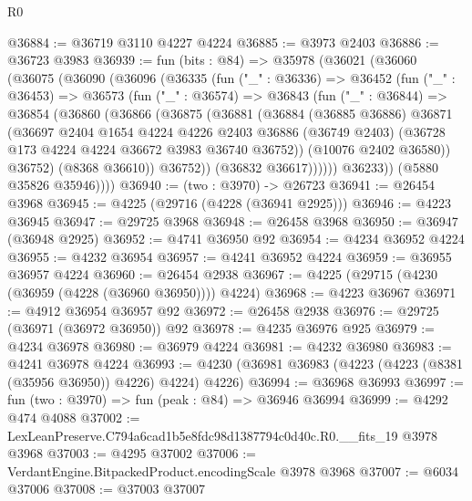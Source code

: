 \begin{lexlean}{R0}
\begin{coremodule}
@36884 := @36719 @3110 @4227 @4224
@36885 := @3973 @2403
@36886 := @36723 @3983
@36939 := fun (bits : @84) =>
  @35978
    (@36021
      (@36060
        (@36075
          (@36090
            (@36096
              (@36335
                (fun ("_" : @36336) =>
                @36452
                  (fun ("_" : @36453) =>
                  @36573
                    (fun ("_" : @36574) =>
                    @36843
                      (fun ("_" : @36844) =>
                      @36854
                        (@36860
                          (@36866
                            (@36875
                              (@36881
                                (@36884
                                  (@36885 @36886)
                                  @36871
                                  (@36697
                                    @2404
                                    @1654
                                    @4224
                                    @4226
                                    @2403
                                    @36886
                                    (@36749 @2403)
                                    (@36728 @173 @4224 @4224 @36672 @3983 @36740 @36752))
                                  (@10076 @2402 @36580))
                                @36752)
                              (@8368 @36610))
                            @36752))
                        (@36832 @36617))))))
              @36233))
          (@5880 @35826 @35946))))
@36940 := (two : @3970) -> @26723
@36941 := @26454 @3968
@36945 := @4225 (@29716 (@4228 (@36941 @2925)))
@36946 := @4223 @36945
@36947 := @29725 @3968
@36948 := @26458 @3968
@36950 := @36947 (@36948 @2925)
@36952 := @4741 @36950 @92
@36954 := @4234 @36952 @4224
@36955 := @4232 @36954
@36957 := @4241 @36952 @4224
@36959 := @36955 @36957 @4224
@36960 := @26454 @2938
@36967 := @4225 (@29715 (@4230 (@36959 (@4228 (@36960 @36950)))) @4224)
@36968 := @4223 @36967
@36971 := @4912 @36954 @36957 @92
@36972 := @26458 @2938
@36976 := @29725 (@36971 (@36972 @36950)) @92
@36978 := @4235 @36976 @925
@36979 := @4234 @36978
@36980 := @36979 @4224
@36981 := @4232 @36980
@36983 := @4241 @36978 @4224
@36993 := @4230 (@36981 @36983 (@4223 (@4223 (@8381 (@35956 @36950)) @4226) @4224) @4226)
@36994 := @36968 @36993
@36997 := fun (two : @3970) => fun (peak : @84) => @36946 @36994
@36999 := @4292 @474 @4088
@37002 := LexLeanPreserve.C794a6cad1b5e8fdc98d1387794c0d40c.R0.__fits_19 @3978 @3968
@37003 := @4295 @37002
@37006 := VerdantEngine.BitpackedProduct.encodingScale @3978 @3968
@37007 := @6034 @37006
@37008 := @37003 @37007

\end{coremodule}
\end{lexlean}
